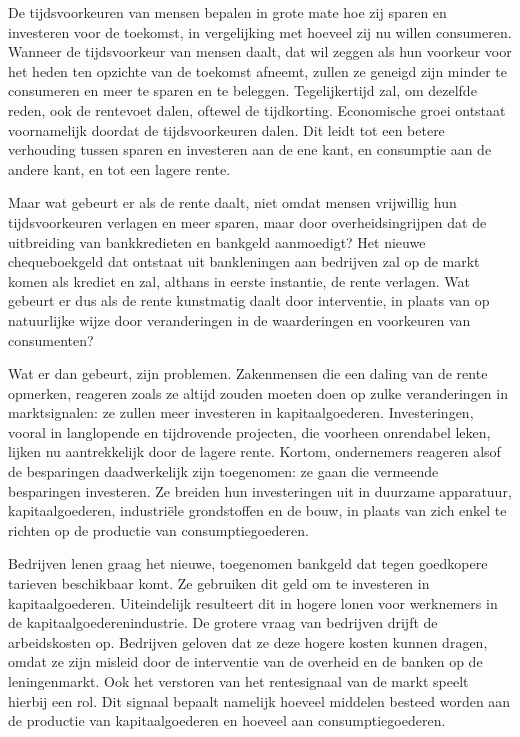 \documentclass[
  a5paper,
  smalldemyvopaper,10pt,twoside,onecolumn,openright,extrafontsizes,hidelinks]{memoir}
\begin{document}
De tijdsvoorkeuren van mensen bepalen in grote mate hoe zij sparen en
investeren voor de toekomst, in vergelijking met hoeveel zij nu willen
consumeren. Wanneer de tijdsvoorkeur van mensen daalt, dat wil zeggen
als hun voorkeur voor het heden ten opzichte van de toekomst afneemt,
zullen ze geneigd zijn minder te consumeren en meer te sparen en te
beleggen. Tegelijkertijd zal, om dezelfde reden, ook de rentevoet dalen,
oftewel de tijdkorting. Economische groei ontstaat voornamelijk doordat
de tijdsvoorkeuren dalen. Dit leidt tot een betere verhouding tussen
sparen en investeren aan de ene kant, en consumptie aan de andere kant,
en tot een lagere rente.

Maar wat gebeurt er als de rente daalt, niet omdat mensen vrijwillig hun
tijdsvoorkeuren verlagen en meer sparen, maar door overheidsingrijpen
dat de uitbreiding van bankkredieten en bankgeld aanmoedigt? Het nieuwe
chequeboekgeld dat ontstaat uit bankleningen aan bedrijven zal op de
markt komen als krediet en zal, althans in eerste instantie, de rente
verlagen. Wat gebeurt er dus als de rente kunstmatig daalt door
interventie, in plaats van op natuurlijke wijze door veranderingen in de
waarderingen en voorkeuren van consumenten?

Wat er dan gebeurt, zijn problemen. Zakenmensen die een daling van de
rente opmerken, reageren zoals ze altijd zouden moeten doen op zulke
veranderingen in marktsignalen: ze zullen meer investeren in
kapitaalgoederen. Investeringen, vooral in langlopende en tijdrovende
projecten, die voorheen onrendabel leken, lijken nu aantrekkelijk door
de lagere rente. Kortom, ondernemers reageren alsof de besparingen
daadwerkelijk zijn toegenomen: ze gaan die vermeende besparingen
investeren. Ze breiden hun investeringen uit in duurzame apparatuur,
kapitaalgoederen, industriële grondstoffen en de bouw, in plaats van
zich enkel te richten op de productie van consumptiegoederen.

Bedrijven lenen graag het nieuwe, toegenomen bankgeld dat tegen
goedkopere tarieven beschikbaar komt. Ze gebruiken dit geld om te
investeren in kapitaalgoederen. Uiteindelijk resulteert dit in hogere
lonen voor werknemers in de kapitaalgoederenindustrie. De grotere vraag
van bedrijven drijft de arbeidskosten op. Bedrijven geloven dat ze deze
hogere kosten kunnen dragen, omdat ze zijn misleid door de interventie
van de overheid en de banken op de leningenmarkt. Ook het verstoren van
het rentesignaal van de markt speelt hierbij een rol. Dit signaal
bepaalt namelijk hoeveel middelen besteed worden aan de productie van
kapitaalgoederen en hoeveel aan consumptiegoederen.
\end{document}
